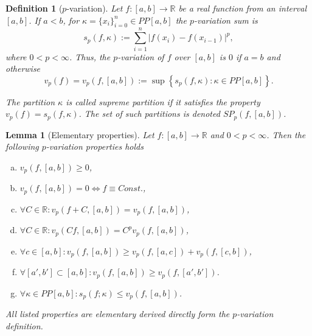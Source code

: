 \documentclass[12pt, a4paper]{article}
\newtheorem{lemma}[theorem]{Lemma}
\newtheorem{definition}[theorem]{Definition}
\numberwithin{equation}{section}
\begin{document}
\begin{definition}[$p$-variation]\label{def:pvar}
  Let $f:[a,b] \rightarrow \mathbb{R}$ be a real function from 
  an interval $[a,b]$.
  If $a<b$, for  $\kappa =\{x_{i}\}_{i=0}^{n} \in PP[a,b]$ 
  the \emph{$p$-variation sum} is 
  \begin{equation}\label{eq:def_pvarsum}
    s_{p}(f,\kappa):=\sum_{i=1}^{n}| f( x_{i}) -f( x_{i-1})|^{p},
  \end{equation}
  where $0<p<\infty $. Thus, the \emph{$p$-variation} 
  of $f$ over $[a,b]$ is $0$ if $a = b$ and otherwise
  \begin{equation}\label{eq:def_pvar}
    v_{p}(f) =v_{p}(f,[a,b]) :=\sup \left\{
    s_{p}(f,\kappa ):\kappa \in PP[a,b]\right\}.    
  \end{equation}
  
  The partition $\kappa$ is called \emph{supreme partition} 
  if it satisfies the property $v_{p}(f) = s_{p}(f,\kappa)$.
  The set of such partitions is denoted
  $SP_{p}(f,[a,b])$.
  
\end{definition}  

 
\begin{lemma}[Elementary properties]\label{lm:element_properties} 
  Let $f:[a,b] \rightarrow \mathbb{R}$ and $0<p<\infty $. 
  Then the following $p$-variation properties holds
  \begin{enumerate}[a)]
    \item \label{lm:ep_a} $ v_p(f,[a,b]) \geq 0 $,
    \item \label{lm:ep_b} $ v_p(f,[a,b]) = 0 \Leftrightarrow f \equiv Const. $,
    \item \label{lm:ep_c} $ \forall C \in \mathbb{R}: v_p(f+C,[a,b]) = v_p(f,[a,b]) $,  
    \item \label{lm:ep_d} $ \forall C \in \mathbb{R}: v_p(Cf,[a,b]) = C^p v_p(f,[a,b]) $,  
    \item \label{lm:ep_e} $ \forall c \in [a,b]: v_p(f,[a,b]) \geq v_p(f,[a,c]) + v_p(f,[c,b]) $,  
    \item \label{lm:ep_f} $ \forall [a',b'] \subset [a,b] : v_p(f,[a,b]) \geq v_p(f,[a',b']) $.  
    \item \label{lm:ep_g} $ \forall \kappa \in PP[a,b]:s_{p}(f;\kappa) \leq v_p(f,[a,b]) $.  
  \end{enumerate}

  All listed properties are elementary derived directly form the $p$-variation definition.
\end{lemma}
 
\end{document}
